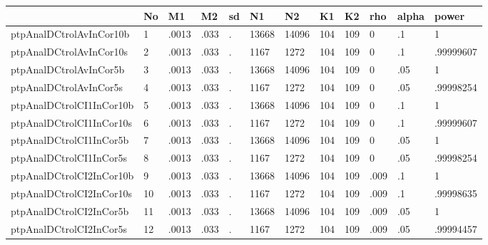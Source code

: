 \begin{tabular}{|l|l|l|l|l|l|l|l|l|l|l|l|}\hline  
 & No  & M1  & M2  & sd  & N1  & N2  & K1  & K2  & rho  & alpha  & power  \\ \hline  
ptpAnalDCtrolAvInCor10b & 1 & .0013 & .033 & . & 13668 & 14096 & 104 & 109 & 0 & .1 & 1 \\ \hline 
ptpAnalDCtrolAvInCor10s & 2 & .0013 & .033 & . & 1167 & 1272 & 104 & 109 & 0 & .1 & .99999607 \\ \hline 
ptpAnalDCtrolAvInCor5b & 3 & .0013 & .033 & . & 13668 & 14096 & 104 & 109 & 0 & .05 & 1 \\ \hline 
ptpAnalDCtrolAvInCor5s & 4 & .0013 & .033 & . & 1167 & 1272 & 104 & 109 & 0 & .05 & .99998254 \\ \hline 
ptpAnalDCtrolCI1InCor10b & 5 & .0013 & .033 & . & 13668 & 14096 & 104 & 109 & 0 & .1 & 1 \\ \hline 
ptpAnalDCtrolCI1InCor10s & 6 & .0013 & .033 & . & 1167 & 1272 & 104 & 109 & 0 & .1 & .99999607 \\ \hline 
ptpAnalDCtrolCI1InCor5b & 7 & .0013 & .033 & . & 13668 & 14096 & 104 & 109 & 0 & .05 & 1 \\ \hline 
ptpAnalDCtrolCI1InCor5s & 8 & .0013 & .033 & . & 1167 & 1272 & 104 & 109 & 0 & .05 & .99998254 \\ \hline 
ptpAnalDCtrolCI2InCor10b & 9 & .0013 & .033 & . & 13668 & 14096 & 104 & 109 & .009 & .1 & 1 \\ \hline 
ptpAnalDCtrolCI2InCor10s & 10 & .0013 & .033 & . & 1167 & 1272 & 104 & 109 & .009 & .1 & .99998635 \\ \hline 
ptpAnalDCtrolCI2InCor5b & 11 & .0013 & .033 & . & 13668 & 14096 & 104 & 109 & .009 & .05 & 1 \\ \hline 
ptpAnalDCtrolCI2InCor5s & 12 & .0013 & .033 & . & 1167 & 1272 & 104 & 109 & .009 & .05 & .99994457 \\ \hline 
  \end{tabular}
